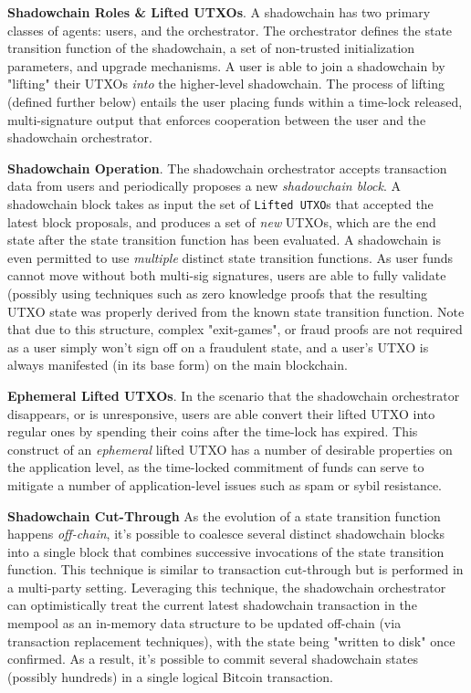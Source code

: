\documentclass[10pt,a4paper]{article}
\theoremstyle{definition}
\begin{document}
\textbf{Shadowchain Roles \& Lifted UTXOs}. A shadowchain has two primary
classes of agents: users, and the orchestrator. The orchestrator defines the
state transition function of the shadowchain, a set of non-trusted
initialization parameters, and upgrade mechanisms. A user is able to join a
shadowchain by "lifting" their UTXOs \emph{into} the higher-level shadowchain.
The process of lifting (defined further below) entails the user placing funds
within a time-lock released, multi-signature output that enforces cooperation
between the user and the shadowchain orchestrator.

\textbf{Shadowchain Operation}. The shadowchain orchestrator accepts
transaction data from users and periodically proposes a new \emph{shadowchain
block}. A shadowchain block takes as input the set of \texttt{Lifted UTXO}s
that accepted the latest block proposals, and produces a set of \emph{new}
UTXOs, which are the end state after the state transition function has been
evaluated. A shadowchain is even permitted to use \emph{multiple} distinct
state transition functions. As user funds cannot move without both multi-sig
signatures, users are able to fully validate (possibly using techniques such as
zero knowledge proofs that the resulting UTXO state was properly derived
from the known state transition function.  Note that due to this structure,
complex "exit-games", or fraud proofs are not required as a user simply
won't sign off on a fraudulent state, and a user's UTXO is always
manifested (in its base form) on the main blockchain.

\textbf{Ephemeral Lifted UTXOs}. In the scenario that the shadowchain
orchestrator disappears, or is unresponsive, users are able convert their
lifted UTXO into regular ones by spending their coins after the time-lock has
expired. This construct of an \emph{ephemeral} lifted UTXO has a number of
desirable properties on the application level, as the time-locked commitment of
funds can serve to mitigate a number of application-level issues such as spam
or sybil resistance.

\textbf{Shadowchain Cut-Through} As the evolution of a state transition
function happens \emph{off-chain}, it's possible to coalesce several distinct
shadowchain blocks into a single block that combines successive invocations of
the state transition function. This technique is similar to transaction
cut-through \cite{cutThru} but is performed in a multi-party setting.
Leveraging this technique, the shadowchain orchestrator can optimistically
treat the current latest shadowchain transaction in the mempool as an in-memory
data structure to be updated off-chain (via transaction replacement
techniques), with the state being "written to disk" once confirmed. As a
result, it's possible to commit several shadowchain states (possibly hundreds)
in a single logical Bitcoin transaction.
\end{document}
